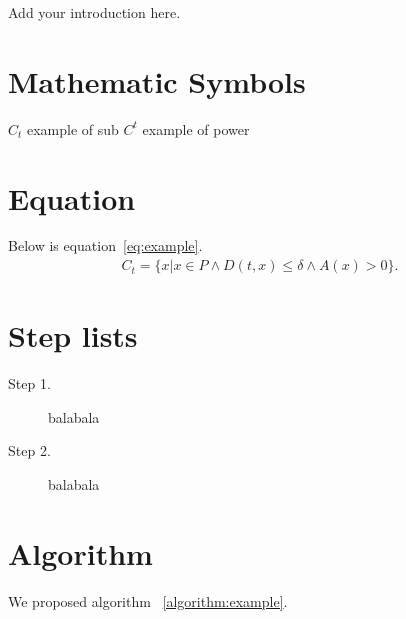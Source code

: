 \hspace{24pt}

Add your introduction here.

\section{Mathematic Symbols}
$C_t$ example of sub
$C^t$ example of power

\section{Equation}
Below is equation~\ref{eq:example}.
\begin{eqnarray}
        C_t=\{x|x \in P \wedge D(t,x) \leq \delta \wedge A(x) > 0 \}.
        \label{eq:example}
\end{eqnarray}

\section{Step lists}
\begin{description}
    \item [Step 1.] balabala
    \item [Step 2.] balabala
\end{description}

\section{Algorithm}
We proposed algorithm ~\ref{algorithm:example}.


